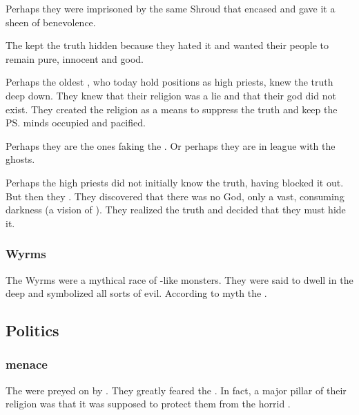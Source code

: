 Perhaps they were imprisoned by the same Shroud that encased \iquin{} and gave it a sheen of benevolence. 

The  kept the truth hidden because they hated it and wanted their people to remain pure, innocent and good. 

Perhaps the oldest \resphain, who today hold positions as high priests, knew the truth deep down. 
They knew that their religion was a lie and that their god did not exist. 
They created the religion as a means to suppress the truth and keep the \ps{\resphain}{} minds occupied and pacified. 

Perhaps they are the ones faking the . 
Or perhaps they are in league with the ghosts. 

Perhaps the high priests did not initially know the truth, having blocked it out. 
But then they . 
They discovered that there was no God, only a vast, consuming darkness (a vision of \Erebos). 
They realized the truth and decided that they must hide it. 





\subsubsection{Wyrms}
The Wyrms were a mythical race of \dragon-like monsters.
They were said to dwell in the deep and symbolized all sorts of evil. 
According to \Merkyran myth the .









\subsection{Politics}





\subsubsection{\Umbra{} menace}
The \Merkyrans{} were preyed on by \umbrae. 
They greatly feared the \umbrae. 
In fact, a major pillar of their religion was that it was supposed to protect them from the horrid \umbrae{}. 


